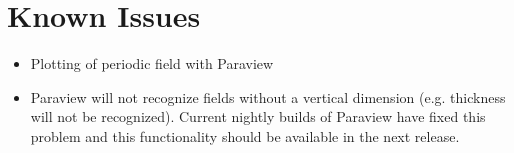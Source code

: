 \chapter{Known Issues}
\label{chap:knownissues}

\begin{itemize}
\item{Plotting of periodic field with Paraview}
\item{Paraview will not recognize fields without a vertical dimension (e.g. thickness will not be recognized).  Current nightly builds of Paraview have fixed this problem and this functionality should be available in the next release.}
\end{itemize}


